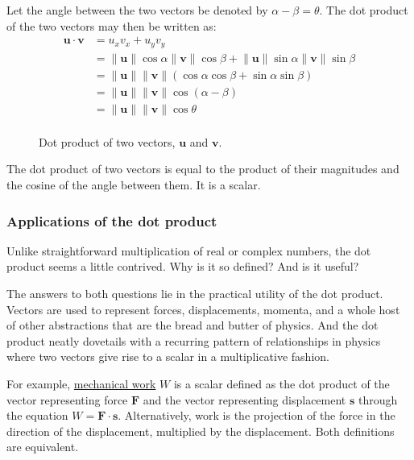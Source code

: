 \documentclass[
  a4paper,
]{article}
\begin{document}
Let the angle between the two vectors be denoted by
\(\alpha - \beta = \theta\). The dot product of the two vectors may then
be written as: \[
\begin{aligned}
\symbf{u} \cdot \symbf{v} &= u_{x}v_{x} + u_{y}v_{y}\\
&= \lVert\symbf{u}\rVert\cos\alpha\lVert\symbf{v}\rVert\cos\beta + \lVert\symbf{u}\rVert\sin\alpha\lVert\symbf{v}\rVert\sin\beta\\
&= \lVert\symbf{u}\rVert\lVert\symbf{v}\rVert(\cos\alpha\cos\beta + \sin\alpha\sin\beta)\\
&= \lVert\symbf{u}\rVert\lVert\symbf{v}\rVert\cos(\alpha - \beta)\\
&= \lVert\symbf{u}\rVert\lVert\symbf{v}\rVert\cos\theta\\
\end{aligned}
\]

\begin{figure}
\hypertarget{fig:dot-product}{%
\centering

\caption{Dot product of two vectors, \(\symbf{u}\) and
\(\symbf{v}\).}\label{fig:dot-product}
}
\end{figure}

The dot product of two vectors is equal to the product of their
magnitudes and the cosine of the angle between them. It is a scalar.

\hypertarget{applications-of-the-dot-product}{%
\subsubsection{Applications of the dot
product}\label{applications-of-the-dot-product}}

Unlike straightforward multiplication of real or complex numbers, the
dot product seems a little contrived. Why is it so defined? And is it
useful?

The answers to both questions lie in the practical utility of the dot
product. Vectors are used to represent forces, displacements, momenta,
and a whole host of other abstractions that are the bread and butter of
physics. And the dot product neatly dovetails with a recurring pattern
of relationships in physics where two vectors give rise to a scalar in a
multiplicative fashion.

For example,
\href{https://en.wikipedia.org/wiki/Work_\%28physics\%29}{mechanical
work} \(W\) is a scalar defined as the dot product of the vector
representing force \(\symbf{F}\) and the vector representing
displacement \(\symbf{s}\) through the equation
\(W = \symbf{F}\cdot\symbf{s}\). Alternatively, work is the projection
of the force in the direction of the displacement, multiplied by the
displacement. Both definitions are equivalent.
\end{document}
